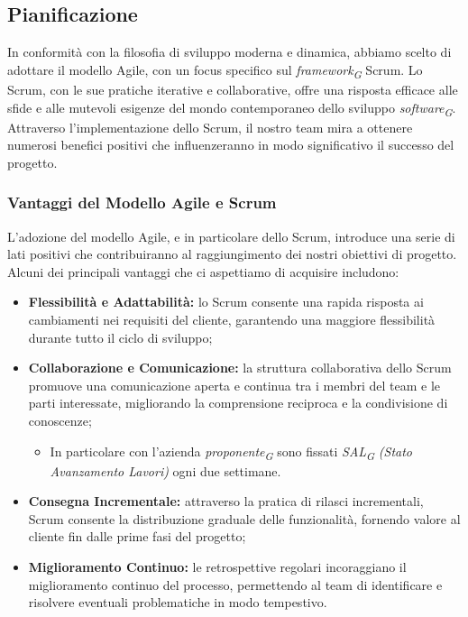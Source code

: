 \subsection{Pianificazione}\label{subsec:Pianificazione}
    In conformità con la filosofia di sviluppo moderna e dinamica, abbiamo scelto di adottare il modello Agile, con un focus specifico sul \textit{framework}\textsubscript{\textit{G}} Scrum.
    Lo Scrum, con le sue pratiche iterative e collaborative, offre una risposta efficace alle sfide e alle mutevoli esigenze del mondo contemporaneo dello sviluppo \textit{software}\textsubscript{\textit{G}}.\\
    Attraverso l’implementazione dello Scrum, il nostro team mira a ottenere numerosi benefici positivi che influenzeranno in modo significativo il successo del progetto.
    

\subsubsection{Vantaggi del Modello Agile e Scrum}
    L'adozione del modello Agile, e in particolare dello Scrum, introduce una serie di lati positivi che contribuiranno al raggiungimento dei nostri obiettivi di progetto.
    Alcuni dei principali vantaggi che ci aspettiamo di acquisire includono:

\begin{itemize}
    \item \textbf{Flessibilità e Adattabilità:}
        lo Scrum consente una rapida risposta ai cambiamenti nei requisiti del cliente, garantendo una maggiore flessibilità durante tutto il ciclo di sviluppo;
    \item \textbf{Collaborazione e Comunicazione:}
        la struttura collaborativa dello Scrum promuove una comunicazione aperta e continua tra i membri del team e le parti interessate, migliorando la comprensione reciproca e la condivisione di conoscenze;
        \begin{itemize}
            \item In particolare con l'azienda \textit{proponente}\textsubscript{\textit{G}} sono fissati \textit{SAL}\textsubscript{\textit{G}} \textit{(Stato Avanzamento Lavori)} ogni due settimane.
        \end{itemize}
    \item \textbf{Consegna Incrementale:}
        attraverso la pratica di rilasci incrementali, Scrum consente la distribuzione graduale delle funzionalità, fornendo valore al cliente fin dalle prime fasi del progetto;
    \item \textbf{Miglioramento Continuo:}
        le retrospettive regolari incoraggiano il miglioramento continuo del processo, permettendo al team di identificare e risolvere eventuali problematiche in modo tempestivo.
\end{itemize}

